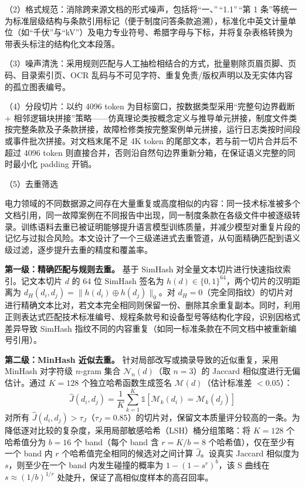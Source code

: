 \documentclass[fontset=fandol,type=master,campus=shenzhen,etitleauto=true]{hithesisbook}
\begin{document}
\noindent （2）格式规范：消除跨来源文档的形式噪声，包括将``一、''\,``1.1''\,``第 1 条''等统一为标准层级结构与条款引用标记（便于制度问答条款追溯），标准化中英文计量单位（如``千伏''与``kV''）及电力专业符号、希腊字母与下标，并将复杂表格转换为带表头标注的结构化文本段落。

\noindent （3）噪声清洗：采用规则匹配与人工抽检相结合的方式，批量剔除页眉页脚、页码、目录索引页、OCR 乱码与不可见字符、重复免责/版权声明以及无实体内容的孤立图表编号。

\noindent （4）分段切片：以约 4096 token 为目标窗口，按数据类型采用``完整句边界截断 + 相邻逻辑块拼接''策略——仿真理论类按概念定义与推导单元拼接，制度文件类按完整条款及子条款拼接，故障检修类按完整案例单元拼接，运行日志类按时间段或事件批次拼接。对文档末尾不足 4K token 的尾部文本，若与前一切片合并后不超过 4096 token 则直接合并，否则沿自然句边界重新分箱，在保证语义完整的同时最小化 padding 开销。

\noindent （5）去重筛选

电力领域的不同数据源之间存在大量重复或高度相似的内容：同一技术标准被多个文档引用，同一故障案例在不同报告中出现，同一制度条款在各级文件中被逐级转录。训练语料去重已被证明能够提升语言模型训练质量，并减少模型对重复片段的记忆与过拟合风险\cite{ref57}。本文设计了一个三级递进式去重管道，从句面精确匹配到语义级过滤，逐步提升去重的精度和覆盖率。

\textbf{第一级：精确匹配与规则去重。} 基于 SimHash 对全量文本切片进行快速指纹索引\cite{ref59,ref60}。记文本切片 $d$ 的 64 位 SimHash 签名为 $h(d) \in \{0,1\}^{64}$，两个切片的汉明距离为 $d_H(d_i, d_j) = \|h(d_i) \oplus h(d_j)\|_0$。对 $d_H = 0$（完全同指纹）的切片对进行精确文本比对，若文本完全相同则保留一份、删除其余重复副本。同时，利用正则表达式匹配技术标准编号、规程条款号和设备型号等结构化字段，识别因格式差异导致 SimHash 指纹不同的内容重复（如同一标准条款在不同文档中被重新编号引用）。

\textbf{第二级：MinHash 近似去重。} 针对局部改写或摘录导致的近似重复，采用 MinHash 对字符级 $n$-gram 集合 $\mathcal{N}_n(d)$（取 $n = 3$）的 Jaccard 相似度进行无偏估计\cite{ref61}。通过 $K = 128$ 个独立哈希函数生成签名 $\mathcal{M}(d)$（估计标准差 $< 0.05$）：
\begin{equation}
\hat{J}(d_i, d_j) = \frac{1}{K} \sum_{k=1}^{K} \mathbb{1}\left[\mathcal{M}_k(d_i) = \mathcal{M}_k(d_j)\right]
\end{equation}
对所有 $\hat{J}(d_i, d_j) > \tau_J$（$\tau_J = 0.85$）的切片对，保留文本质量评分较高的一条。为降低逐对比较的复杂度，采用局部敏感哈希（LSH）桶分组策略\cite{ref62}：将 $K=128$ 个哈希值分为 $b=16$ 个 band（每个 band 含 $r = K/b = 8$ 个哈希值），仅在至少有一个 band 内 $r$ 个哈希值完全相同的候选对之间计算 $\hat{J}$。设真实 Jaccard 相似度为 $s$，则至少在一个 band 内发生碰撞的概率为 $1 - (1 - s^r)^b$，该 S 曲线在 $s \approx (1/b)^{1/r}$ 处陡升，保证了高相似度样本的高召回率。
\end{document}
